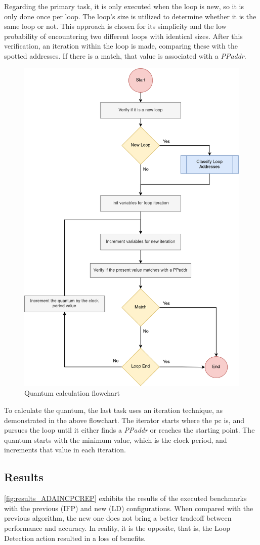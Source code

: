 Regarding the primary task, it is only executed when the loop is new, so it is only done once per loop. The loop's size is utilized to 
determine whether it is the same loop or not. This approach is chosen for its simplicity and the low probability of encountering two different 
loops with identical sizes. After this verification, an iteration within the loop is made, comparing these with the spotted addresses. If there 
is a match, that value is associated with a \textit{PPaddr}. 

\begin{figure}[H]
	\centering
 	\includegraphics[width=0.5\linewidth]{Images/Repetition_flowchart_quantum.png}
 	\caption{Quantum calculation flowchart}
	 \label{fig_Repetition_flowchart_quantum}
\end{figure}

To calculate the quantum, the last task uses an iteration technique, as demonstrated in the above flowchart. 
The iterator starts where the \gls{pc} is, and pursues the loop until it either finds a \textit{PPaddr} or reaches the starting point. 
The quantum starts with the minimum value, which is the clock period, and increments that value in each iteration.

\subsection{Results}

\autoref{fig:results_ADAINCPCREP} exhibits the results of the executed benchmarks with the previous (IFP) and new (LD) configurations. 
When compared with the previous algorithm, the new one does not bring a better tradeoff between performance and accuracy. 
In reality, it is the opposite, that is, the Loop Detection action resulted in a loss of benefits. 


